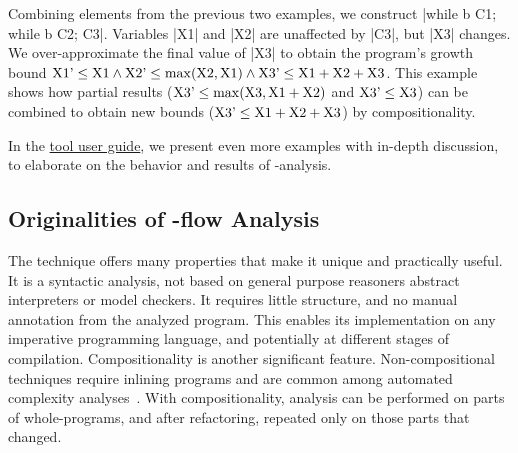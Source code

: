 \documentclass[runningheads]{llncs}
\newcommand{\toolURL}{https://statycc.github.io/.github/pymwp/}{}
\begin{document}
\begin{example}\label{ex:composition}%
	Combining elements from the previous two examples, we construct \prc|while b C1; while b C2; C3|.
	Variables \prc|X1| and \prc|X2| are unaffected by \prc|C3|, but \prc|X3| changes.
	We over-approximate the final value of \prc|X3| to obtain the program's growth bound
	$\text{\prc|X1|'} \leq \text{\prc|X1|} \wedge \text{\prc|X2|'}\leq \max(\text{\prc|X2|}, \text{\prc|X1|}) \wedge \text{\prc|X3|'} \leq \text{\prc|X1|}+\text{\prc|X2|}+\text{\prc|X3|}$. This example shows how partial results ($\text{\prc|X3|'} \leq \max(\text{\prc|X3|},\text{\prc|X1|}+\text{\prc|X2|})$ and $\text{\prc|X3|'} \leq \text{\prc|X3|}$) can be combined to obtain new bounds ($\text{\prc|X3|'} \leq \text{\prc|X1|}+\text{\prc|X2|}+\text{\prc|X3|}$) by compositionality.
\end{example}


In the \href{\toolURL}{tool user guide}, we present even more examples with in-depth discussion, to elaborate on the behavior and results of \mwp-analysis.


\subsection{Originalities of \mwp-flow Analysis} %
\label{subsec:relevance}


The \mwp technique offers many properties that make it unique and practically useful.
It is a syntactic analysis, not based on general purpose reasoners \eg abstract interpreters or model checkers. 
It requires little structure, and no manual annotation from the analyzed program.
This enables its implementation on any imperative programming language, and potentially at different stages of compilation.
Compositionality is another significant feature.
Non-compositional techniques require inlining programs and are common among automated complexity analyses~\cite{Carbonneaux2015}.
With compositionality, analysis can be performed on parts of whole-programs, and after refactoring, repeated only on those parts that changed.
\end{document}
